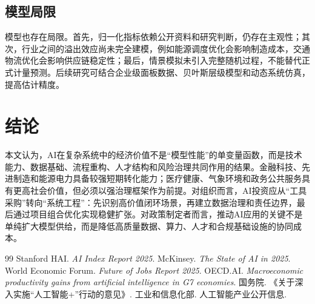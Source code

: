 \documentclass[UTF8,a4paper,12pt]{ctexart}
\begin{document}
\subsection{模型局限}
模型也存在局限。首先，归一化指标依赖公开资料和研究判断，仍存在主观性；其次，行业之间的溢出效应尚未完全建模，例如能源调度优化会影响制造成本，交通物流优化会影响供应链稳定性；最后，情景模拟未引入完整随机过程，不能替代正式计量预测。后续研究可结合企业级面板数据、贝叶斯层级模型和动态系统仿真，提高估计精度。

\section{结论}
本文认为，AI在复杂系统中的经济价值不是“模型性能”的单变量函数，而是技术能力、数据基础、流程重构、人才结构和风险治理共同作用的结果。金融科技、先进制造和能源电力具备较强短期转化能力；医疗健康、气象环境和政务公共服务具有更高社会价值，但必须以强治理框架作为前提。对组织而言，AI投资应从“工具采购”转向“系统工程”：先识别高价值闭环场景，再建立数据治理和责任边界，最后通过项目组合优化实现稳健扩张。对政策制定者而言，推动AI应用的关键不是单纯扩大模型供给，而是降低高质量数据、算力、人才和合规基础设施的协同成本。

\clearpage
\begin{thebibliography}{99}
 Stanford HAI. \textit{AI Index Report 2025}.
 McKinsey. \textit{The State of AI in 2025}.
 World Economic Forum. \textit{Future of Jobs Report 2025}.
 OECD.AI. \textit{Macroeconomic productivity gains from artificial intelligence in G7 economies}.
 国务院. 《关于深入实施“人工智能+”行动的意见》.
 工业和信息化部. 人工智能产业公开信息.
\end{thebibliography}
\end{document}
